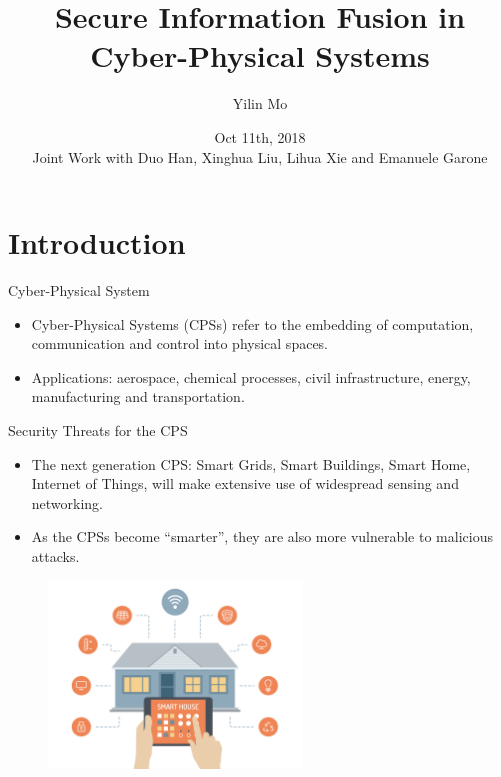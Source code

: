 \documentclass[10pt]{beamer}
\title[Secure Info Fusion]{Secure Information Fusion in Cyber-Physical Systems}
\author[Yilin Mo]{Yilin Mo}
\institute[Tsinghua]{
  Department of Automation\\ Tsinghua University\\
}
\date[Oct 11, 2018]{Oct 11th, 2018 \\ 
  \small Joint Work with Duo Han, Xinghua Liu, Lihua Xie and Emanuele Garone}
\begin{document}
\maketitle 

\section{Introduction}

\begin{frame}{Cyber-Physical System}
  \begin{itemize}
  \item Cyber-Physical Systems (CPSs) refer to the embedding of computation, communication and control into physical spaces.
    \begin{center}
    \end{center}
  \item Applications: aerospace, chemical processes, civil infrastructure, energy, manufacturing and transportation. 
  \end{itemize}
\end{frame}

\begin{frame}{Security Threats for the CPS}
  \begin{itemize}
  \item The next generation CPS: Smart Grids, Smart Buildings, Smart Home, Internet of Things, will make extensive use of widespread sensing and networking.
  \item As the CPSs become ``smarter'', they are also more vulnerable to malicious attacks.
  \end{itemize}
  \begin{figure}[ht]
    \centering
    \includegraphics[width=0.6\textwidth]{SmartHome.jpg}
  \end{figure}
\end{frame}
\end{document}
